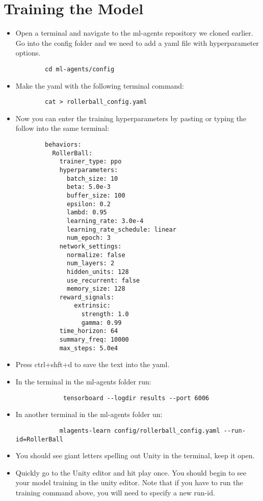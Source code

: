 \documentclass[11pt,fleqn,openany]{book} %
\begin{document}
\section{Training the Model}
\begin{itemize}
    \item Open a terminal and navigate to the ml-agents repository we cloned earlier. Go into the config folder and we need to add a yaml file with hyperparameter options. \begin{verbatim}
        cd ml-agents/config
    \end{verbatim}
    \item Make the yaml with the following terminal command: \begin{verbatim}
        cat > rollerball_config.yaml
    \end{verbatim}
    \item Now you can enter the training hyperparameters by pasting or typing the follow into the same terminal:\begin{verbatim}
        behaviors:
          RollerBall:
            trainer_type: ppo
            hyperparameters:
              batch_size: 10
              beta: 5.0e-3
              buffer_size: 100
              epsilon: 0.2
              lambd: 0.95
              learning_rate: 3.0e-4
              learning_rate_schedule: linear
              num_epoch: 3
            network_settings:
              normalize: false
              num_layers: 2
              hidden_units: 128
              use_recurrent: false
              memory_size: 128
            reward_signals:
                extrinsic:
                  strength: 1.0
                  gamma: 0.99
            time_horizon: 64
            summary_freq: 10000
            max_steps: 5.0e4
    \end{verbatim}
    \item Press ctrl+shft+d to save the text into the yaml.
    \item In the terminal in the ml-agents folder run:
        \begin{verbatim}
             tensorboard --logdir results --port 6006
        \end{verbatim}
    \item In another terminal in the ml-agents folder un:
        \begin{verbatim}
            mlagents-learn config/rollerball_config.yaml --run-id=RollerBall
        \end{verbatim}
    \item You should see giant letters spelling out Unity in the terminal, keep it open.
    \item Quickly go to the Unity editor and hit play once. You should begin to see your model training in the unity editor. Note that if you have to run the training command above, you will need to specify a new run-id.
\end{itemize}
\end{document}
